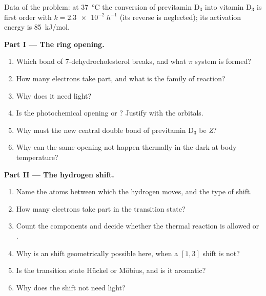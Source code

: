 \begin{problem}
\label{pb:b3:pericyclic:1}
Data of the problem: at \qty{37}{\celsius} the conversion of previtamin D$_3$ into vitamin D$_3$ is
first order with $k = \qty{2.3e-2}{h^{-1}}$ (its reverse is neglected); its activation energy is
\qty{85}{kJ/mol}.

\medskip\noindent\textbf{Part I --- The ring opening.}
\begin{enumerate}
  \item Which bond of 7-dehydrocholesterol breaks, and what $\pi$ system is formed?
  \item How many electrons take part, and what is the family of reaction?
  \item Why does it need light?
  \item Is the photochemical opening  or ? Justify with the
        orbitals.
  \item Why must the new central double bond of previtamin D$_3$ be \textit{Z}?
  \item Why can the same opening not happen thermally in the dark at body temperature?
\end{enumerate}

\medskip\noindent\textbf{Part II --- The hydrogen shift.}
\begin{enumerate}[resume]
  \item Name the atoms between which the hydrogen moves, and the type of shift.
  \item How many electrons take part in the transition state?
  \item Count the components and decide whether the thermal reaction is allowed
         or .
  \item Why is an  shift geometrically possible here, when a $[1,3]$ shift
        is not?
  \item Is the transition state Hückel or Möbius, and is it aromatic?
  \item Why does the shift not need light?
\end{enumerate}


\end{problem}
